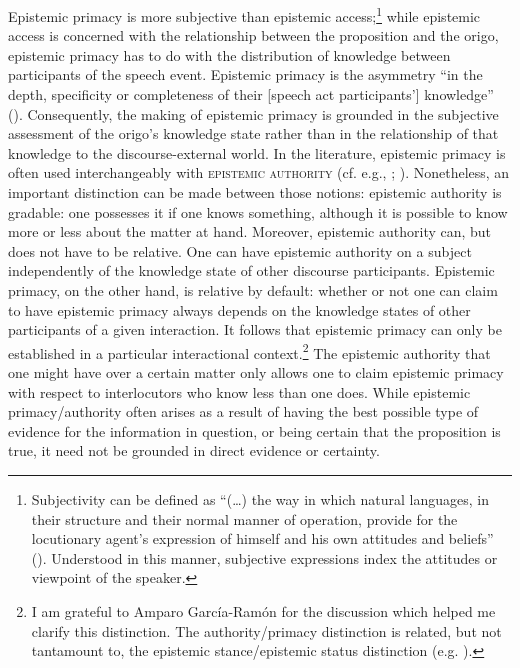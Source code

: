 \documentclass[output=paper]{langscibook}
\begin{document}
Epistemic primacy is more subjective than epistemic access;\footnote{Subjectivity can be defined as “(…) the way in which natural languages, in their structure and their normal manner of operation, provide for the locutionary agent’s expression of himself and his own attitudes and beliefs” (\citealt[102]{Lyons1982}). Understood in this manner, subjective expressions index the attitudes or viewpoint of the speaker.\label{fn:subjectivity}} while epistemic access is concerned with the relationship between the proposition and the origo, epistemic primacy has to do with the distribution of knowledge between participants of the speech event. Epistemic primacy is the asymmetry “in the depth, specificity or completeness of their [speech act participants’] knowledge” (\citealt[13]{Stivers2011}). Consequently, the making of epistemic primacy is grounded in the subjective assessment of the origo’s knowledge state rather than in the relationship of that knowledge to the discourse-external world. In the literature, epistemic primacy is often used interchangeably with \textsc{epistemic authority} (cf. e.g., \citealt{Grzech2016a}; \citealt{Garcia-Ramon2018}). Nonetheless, an important distinction can be made between those notions: epistemic authority is gradable: one possesses it if one knows something, although it is possible to know more or less about the matter at hand. Moreover, epistemic authority can, but does not have to be relative. One can have epistemic authority on a subject independently of the knowledge state of other discourse participants. Epistemic primacy, on the other hand, is relative by default: whether or not one can claim to have epistemic primacy always depends on the knowledge states of other participants of a given interaction. It follows that epistemic primacy can only be established in a particular interactional context.\footnote{I am grateful to Amparo García-Ramón for the discussion which helped me clarify this distinction. The authority/primacy distinction is related, but not tantamount to, the epistemic stance/epistemic status distinction (e.g. \citealt{Heritage2012}).} The epistemic authority that one might have over a certain matter only allows one to claim epistemic primacy with respect to interlocutors who know less than one does. While epistemic primacy/authority often arises as a result of having the best possible type of evidence for the information in question, or being certain that the proposition is true, it need not be grounded in direct evidence or certainty.
\end{document}
